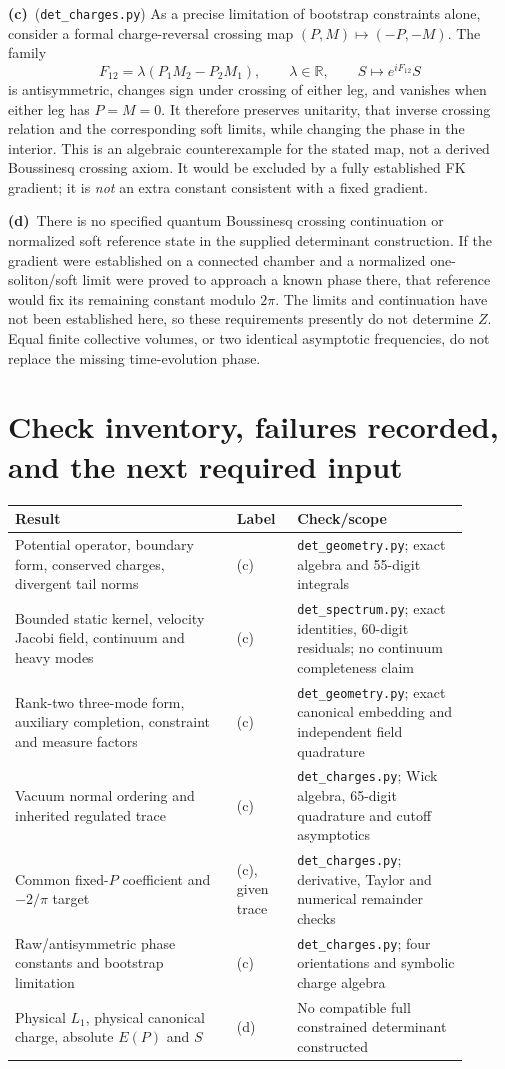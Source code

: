 \documentclass[11pt,a4paper]{article}
\newcommand{\Lc}{\textbf{(c)}}
\newcommand{\Ld}{\textbf{(d)}}
\newcommand{\G}{\texttt{det\_geometry.py}}
\newcommand{\Scheck}{\texttt{det\_spectrum.py}}
\newcommand{\Ccheck}{\texttt{det\_charges.py}}
\newcommand{\R}{\mathbb R}
\begin{document}
\Lc\ (\Ccheck) As a precise limitation of bootstrap constraints alone,
consider a formal charge-reversal crossing map $(P,M)\mapsto(-P,-M)$.
The family
\begin{equation}
 F_{12}=\lambda(P_1M_2-P_2M_1),\qquad \lambda\in\R,
 \qquad S\mapsto e^{iF_{12}}S
\end{equation}
is antisymmetric, changes sign under crossing of either leg, and vanishes
when either leg has $P=M=0$. It therefore preserves unitarity, that inverse
crossing relation and the corresponding soft limits, while changing the
phase in the interior. This is an algebraic counterexample for the stated
map, not a derived Boussinesq crossing axiom. It would be excluded by a
fully established FK gradient; it is \emph{not} an extra constant consistent
with a fixed gradient.

\Ld\ There is no specified quantum Boussinesq crossing continuation or
normalized soft reference state in the supplied determinant construction.
If the gradient were established on a connected chamber and a normalized
one-soliton/soft limit were proved to approach a known phase there, that
reference would fix its remaining constant modulo $2\pi$. The limits and
continuation have not been established here, so these requirements presently
do not determine $Z$. Equal finite collective volumes, or two identical
asymptotic frequencies, do not replace the missing time-evolution phase.

\clearpage
\section{Check inventory, failures recorded, and the next required input}
\begin{longtable}{p{0.44\linewidth}p{0.12\linewidth}p{0.34\linewidth}}
\toprule Result & Label & Check/scope\\\midrule
Potential operator, boundary form, conserved charges, divergent tail norms
 & (c) & \G; exact algebra and 55-digit integrals\\
Bounded static kernel, velocity Jacobi field, continuum and heavy modes
 & (c) & \Scheck; exact identities, 60-digit residuals; no continuum completeness claim\\
Rank-two three-mode form, auxiliary completion, constraint and measure factors
 & (c) & \G; exact canonical embedding and independent field quadrature\\
Vacuum normal ordering and inherited regulated trace
 & (c) & \Ccheck; Wick algebra, 65-digit quadrature and cutoff asymptotics\\
Common fixed-$P$ coefficient and $-2/\pi$ target
 & (c), given trace & \Ccheck; derivative, Taylor and numerical remainder checks\\
Raw/antisymmetric phase constants and bootstrap limitation
 & (c) & \Ccheck; four orientations and symbolic charge algebra\\
Physical $L_1$, physical canonical charge, absolute $E(P)$ and $S$
 & (d) & No compatible full constrained determinant constructed\\
\bottomrule
\end{longtable}
\end{document}
